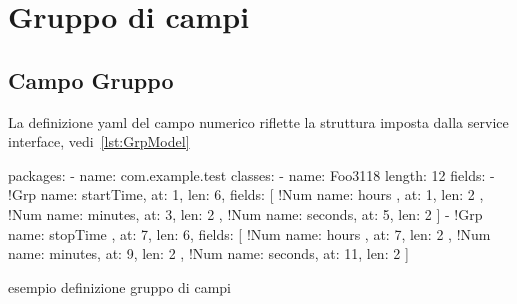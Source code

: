 \documentclass[a4paper,10pt]{report}
\newif\ifesource
\newenvironment{elisting}[1][H]
  {\captionsetup{aboveskip=0pt}\begin{listing}[#1]}
  {\end{listing}%
}
\begin{document}
\section{Gruppo di campi}

\subsection{Campo Gruppo} \label{sub:yaml.grp}
La definizione yaml del campo numerico riflette la struttura imposta dalla
service interface, vedi~\ref{lst:GrpModel}

\ifesource
\begin{figure*}[!htb]
\begin{lstlisting}[language=yaml, 
caption={esempio definizione gruppo di campi}, 
label=lst:xmplGrp]
packages:
  - name: com.example.test
    classes:
      - name: Foo3118
        length: 12
        fields:
          - !Grp { name: startTime, at: 1, len: 6, fields: [
            !Num { name: hours  , at: 1, len: 2 }, 
            !Num { name: minutes, at: 3, len: 2 }, 
            !Num { name: seconds, at: 5, len: 2 }
            ] }
          - !Grp { name: stopTime , at: 7, len: 6, fields: [
            !Num { name: hours  , at:  7, len: 2 }, 
            !Num { name: minutes, at:  9, len: 2 }, 
            !Num { name: seconds, at: 11, len: 2 }
            ] }
\end{lstlisting}
\end{figure*}
\else
\begin{elisting}[!htb]
\begin{yamlcode}
packages:
  - name: com.example.test
    classes:
      - name: Foo3118
        length: 12
        fields:
          - !Grp { name: startTime, at: 1, len: 6, fields: [
            !Num { name: hours  , at: 1, len: 2 }, 
            !Num { name: minutes, at: 3, len: 2 }, 
            !Num { name: seconds, at: 5, len: 2 }
            ] }
          - !Grp { name: stopTime , at: 7, len: 6, fields: [
            !Num { name: hours  , at:  7, len: 2 }, 
            !Num { name: minutes, at:  9, len: 2 }, 
            !Num { name: seconds, at: 11, len: 2 }
            ] }
\end{yamlcode}
\caption{esempio definizione gruppo di campi}
\label{lst:xmplGrp}
\end{elisting}
\fi
\end{document}
